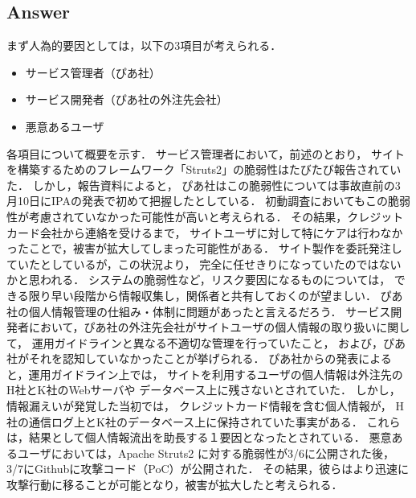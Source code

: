 \documentclass[uplatex]{jsarticle}
\begin{document}
\subsection*{Answer}
まず人為的要因としては，以下の3項目が考えられる．
\begin{itemize}
    \item サービス管理者（ぴあ社）
    \item サービス開発者（ぴあ社の外注先会社）
    \item 悪意あるユーザ
\end{itemize}
各項目について概要を示す．
サービス管理者において，前述のとおり，
サイトを構築するためのフレームワーク「Struts2」の脆弱性はたびたび報告されていた．
しかし，報告資料によると，
ぴあ社はこの脆弱性については事故直前の3月10日にIPAの発表で初めて把握したとしている．
初動調査においてもこの脆弱性が考慮されていなかった可能性が高いと考えられる．
その結果，クレジットカード会社から連絡を受けるまで，
サイトユーザに対して特にケアは行わなかったことで，被害が拡大してしまった可能性がある．
サイト製作を委託発注していたとしているが，この状況より，
完全に任せきりになっていたのではないかと思われる．
システムの脆弱性など，リスク要因になるものについては，
できる限り早い段階から情報収集し，関係者と共有しておくのが望ましい．
ぴあ社の個人情報管理の仕組み・体制に問題があったと言えるだろう．
サービス開発者において，ぴあ社の外注先会社がサイトユーザの個人情報の取り扱いに関して，
運用ガイドラインと異なる不適切な管理を行っていたこと，
および，ぴあ社がそれを認知していなかったことが挙げられる．
ぴあ社からの発表によると，運用ガイドライン上では，
サイトを利用するユーザの個人情報は外注先のH社とK社のWebサーバや
データベース上に残さないとされていた．
しかし，情報漏えいが発覚した当初では，
クレジットカード情報を含む個人情報が，
H社の通信ログ上とK社のデータベース上に保持されていた事実がある．
これらは，結果として個人情報流出を助長する１要因となったとされている．
悪意あるユーザにおいては，Apache Struts2 に対する脆弱性が3/6に公開された後，
3/7にGithubに攻撃コード（PoC）が公開された．
その結果，彼らはより迅速に攻撃行動に移ることが可能となり，被害が拡大したと考えられる．
\end{document}

